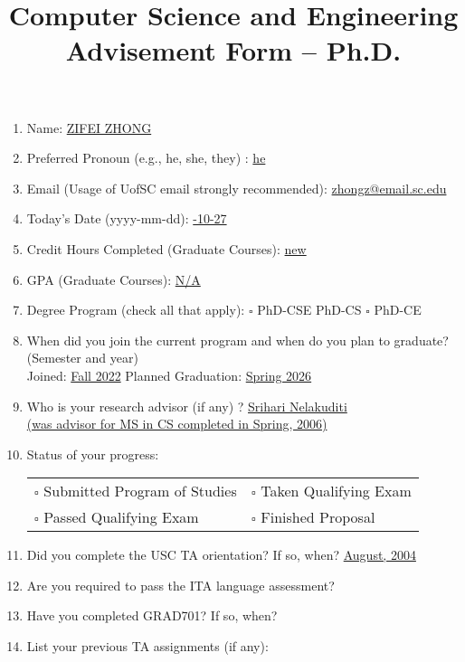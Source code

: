 \documentclass[11pt, oneside]{article}   	%
\title{Computer Science and Engineering Advisement Form -- Ph.D.}
\date{}							%
\begin{document}
\maketitle

\begin{enumerate}
\item Name: \underline{\quad ZIFEI ZHONG \quad}
\item Preferred Pronoun (e.g., he, she, they) : \underline{\quad he \quad}
\item Email (Usage of UofSC email strongly recommended): \underline{\quad zhongz@email.sc.edu \quad}
\item Today's Date (yyyy-mm-dd): \underline{-10-27 \quad}
\item Credit Hours Completed (Graduate Courses): \underline{\quad new \quad}
\item GPA (Graduate Courses): \underline{\quad N/A \quad}
\item Degree Program (check all that apply): $\square$ PhD-CSE \quad \makebox[0pt][l]{$\square$}\raisebox{.15ex}{\hspace{0.1em}$\checkmark$}  PhD-CS \quad $\square$ PhD-CE
\item When did you join the current program and when do you plan to graduate? (Semester and year)\\
 Joined: \underline{\quad Fall 2022\quad } \qquad Planned Graduation: \underline{\quad Spring 2026\quad}
\item Who is your research advisor (if any) ? \underline{\quad Srihari Nelakuditi \quad }\\
\underline{\quad (was advisor for MS in CS completed in Spring, 2006) \quad}
\item Status of your progress:\\
\begin{tabular}{l l}
$\square$ Submitted Program of Studies & $\square$ Taken Qualifying Exam\\
$\square$ Passed Qualifying Exam & $\square$ Finished Proposal
\end{tabular}
\item Did you complete the USC TA orientation? If so, when? \underline{\qquad August, 2004\qquad}
\item Are you required to pass the ITA language assessment? \underline{\qquad\qquad}
\item Have you completed GRAD701? If so, when? \underline{\qquad\qquad}
\item List your previous TA assignments (if any): 


\end{enumerate}
\end{document}
